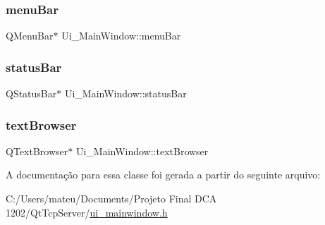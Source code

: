 \subsubsection{\texorpdfstring{menu\+Bar}{menuBar}}
{\footnotesize\ttfamily Q\+Menu\+Bar$\ast$ Ui\+\_\+\+Main\+Window\+::menu\+Bar}

\mbox{\label{class_ui___main_window_a50fa481337604bcc8bf68de18ab16ecd}} 
\subsubsection{\texorpdfstring{status\+Bar}{statusBar}}
{\footnotesize\ttfamily Q\+Status\+Bar$\ast$ Ui\+\_\+\+Main\+Window\+::status\+Bar}

\mbox{\label{class_ui___main_window_a2c789c07fa5fc1cee05aae8df52bb02d}} 
\subsubsection{\texorpdfstring{text\+Browser}{textBrowser}}
{\footnotesize\ttfamily Q\+Text\+Browser$\ast$ Ui\+\_\+\+Main\+Window\+::text\+Browser}



A documentação para essa classe foi gerada a partir do seguinte arquivo\+:\begin{DoxyCompactItemize}
\item 
C\+:/\+Users/mateu/\+Documents/\+Projeto Final D\+C\+A 1202/\+Qt\+Tcp\+Server/\mbox{\hyperlink{ui__mainwindow_8h}{ui\+\_\+mainwindow.\+h}}\end{DoxyCompactItemize}
